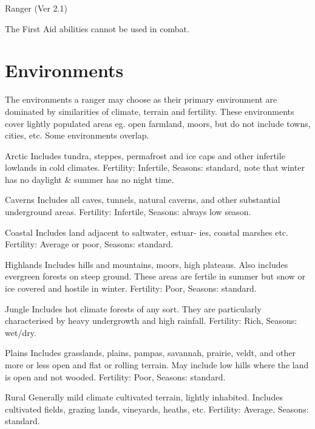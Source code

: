 \begin{Chapter}{Ranger (Ver 2.1)}
\begin{Description}
The First Aid abilities cannot be used in combat.

\end{Description}

\section{Environments}

The environments a ranger may choose as their primary environment are
dominated by similarities of climate, terrain and fertility. These
environments cover lightly populated areas eg.  open farmland, moors,
but do not include towns, cities, etc.  Some environments overlap.

\begin{Description}

\item[Arctic] Includes tundra, steppes, permafrost and ice caps and
  other infertile lowlands in cold climates.  Fertility: Infertile,
  Seasons: standard, note that winter has no daylight \& summer has no
  night time.

\item[Caverns] Includes all caves, tunnels, natural caverns, and other
  substantial underground areas.  Fertility: Infertile, Seasons:
  always low season.

\item[Coastal] Includes land adjacent to saltwater, estuar- ies,
  coastal marshes etc. Fertility: Average or poor, Seasons: standard.

\item[Highlands] Includes hills and mountains, moors, high plateaus.
  Also includes evergreen forests on steep ground. These areas are
  fertile in summer but snow or ice covered and hostile in
  winter. Fertility: Poor, Seasons: standard.

\item[Jungle] Includes hot climate forests of any sort.  They are
  particularly characterised by heavy undergrowth and high rainfall.
  Fertility: Rich, Seasons: wet/dry.

\item[Plains] Includes grasslands, plains, pampas, savannah, prairie,
  veldt, and other more or less open and flat or rolling terrain. May
  include low hills where the land is open and not wooded.  Fertility:
  Poor, Seasons: standard.

\item[Rural] Generally mild climate cultivated terrain, lightly
  inhabited. Includes cultivated fields, grazing lands, vineyards,
  heaths, etc.  Fertility: Average, Seasons: standard.


\end{Description}
\end{Chapter}

